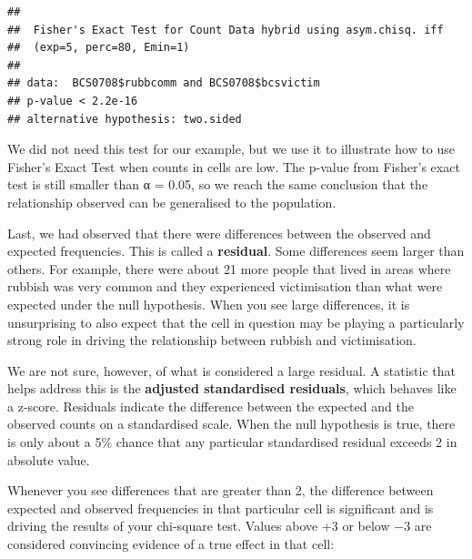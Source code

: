 \documentclass[
]{book}
\newenvironment{Shaded}{\begin{snugshade}}{\end{snugshade}}
\newcommand{\AttributeTok}[1]{\textcolor[rgb]{0.77,0.63,0.00}{#1}}
\newcommand{\CommentTok}[1]{\textcolor[rgb]{0.56,0.35,0.01}{\textit{#1}}}
\newcommand{\ConstantTok}[1]{\textcolor[rgb]{0.00,0.00,0.00}{#1}}
\newcommand{\FloatTok}[1]{\textcolor[rgb]{0.00,0.00,0.81}{#1}}
\newcommand{\FunctionTok}[1]{\textcolor[rgb]{0.00,0.00,0.00}{#1}}
\newcommand{\NormalTok}[1]{#1}
\newcommand{\SpecialCharTok}[1]{\textcolor[rgb]{0.00,0.00,0.00}{#1}}
\begin{document}
\begin{Shaded}
\end{Shaded}

\begin{verbatim}
## 
##  Fisher's Exact Test for Count Data hybrid using asym.chisq. iff
##  (exp=5, perc=80, Emin=1)
## 
## data:  BCS0708$rubbcomm and BCS0708$bcsvictim
## p-value < 2.2e-16
## alternative hypothesis: two.sided
\end{verbatim}

We did not need this test for our example, but we use it to illustrate how to use Fisher's Exact Test when counts in cells are low. The p-value from Fisher's exact test is still smaller than α = 0.05, so we reach the same conclusion that the relationship observed can be generalised to the population.

Last, we had observed that there were differences between the observed and expected frequencies. This is called a \textbf{residual}. Some differences seem larger than others. For example, there were about 21 more people that lived in areas where rubbish was very common and they experienced victimisation than what were expected under the null hypothesis. When you see large differences, it is unsurprising to also expect that the cell in question may be playing a particularly strong role in driving the relationship between rubbish and victimisation.

We are not sure, however, of what is considered a large residual. A statistic that helps address this is the \textbf{adjusted standardised residuals}, which behaves like a z-score. Residuals indicate the difference between the expected and the observed counts on a standardised scale. When the null hypothesis is true, there is only about a 5\% chance that any particular standardised residual exceeds 2 in absolute value.

Whenever you see differences that are greater than 2, the difference between expected and observed frequencies in that particular cell is significant and is driving the results of your chi-square test. Values above +3 or below −3 are considered convincing evidence of a true effect in that cell:
\end{document}
